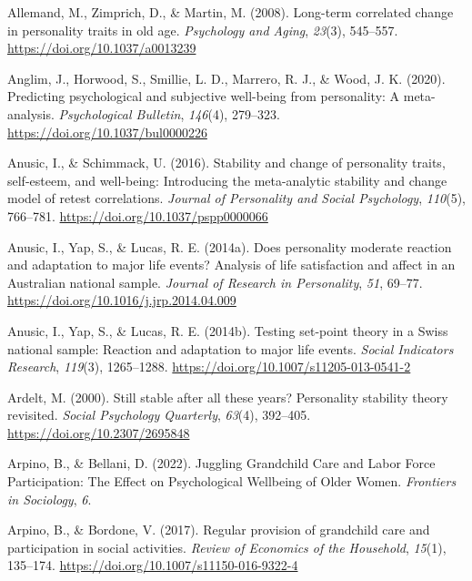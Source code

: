 \documentclass[
  english,
  man,floatsintext]{apa7}
\begin{document}
\leavevmode\hypertarget{ref-allemandLongtermCorrelatedChange2008a}{}%
Allemand, M., Zimprich, D., \& Martin, M. (2008). Long-term correlated change in personality traits in old age. \emph{Psychology and Aging}, \emph{23}(3), 545--557. \url{https://doi.org/10.1037/a0013239}

\leavevmode\hypertarget{ref-anglimPredictingPsychologicalSubjective2020}{}%
Anglim, J., Horwood, S., Smillie, L. D., Marrero, R. J., \& Wood, J. K. (2020). Predicting psychological and subjective well-being from personality: A meta-analysis. \emph{Psychological Bulletin}, \emph{146}(4), 279--323. \url{https://doi.org/10.1037/bul0000226}

\leavevmode\hypertarget{ref-anusicStabilityChangePersonality2016}{}%
Anusic, I., \& Schimmack, U. (2016). Stability and change of personality traits, self-esteem, and well-being: Introducing the meta-analytic stability and change model of retest correlations. \emph{Journal of Personality and Social Psychology}, \emph{110}(5), 766--781. \url{https://doi.org/10.1037/pspp0000066}

\leavevmode\hypertarget{ref-anusicDoesPersonalityModerate2014}{}%
Anusic, I., Yap, S., \& Lucas, R. E. (2014a). Does personality moderate reaction and adaptation to major life events? Analysis of life satisfaction and affect in an Australian national sample. \emph{Journal of Research in Personality}, \emph{51}, 69--77. \url{https://doi.org/10.1016/j.jrp.2014.04.009}

\leavevmode\hypertarget{ref-anusicTestingSetpointTheory2014}{}%
Anusic, I., Yap, S., \& Lucas, R. E. (2014b). Testing set-point theory in a Swiss national sample: Reaction and adaptation to major life events. \emph{Social Indicators Research}, \emph{119}(3), 1265--1288. \url{https://doi.org/10.1007/s11205-013-0541-2}

\leavevmode\hypertarget{ref-ardeltStillStableAll2000}{}%
Ardelt, M. (2000). Still stable after all these years? Personality stability theory revisited. \emph{Social Psychology Quarterly}, \emph{63}(4), 392--405. \url{https://doi.org/10.2307/2695848}

\leavevmode\hypertarget{ref-arpinoJugglingGrandchildCare2022}{}%
Arpino, B., \& Bellani, D. (2022). Juggling Grandchild Care and Labor Force Participation: The Effect on Psychological Wellbeing of Older Women. \emph{Frontiers in Sociology}, \emph{6}.

\leavevmode\hypertarget{ref-arpinoRegularProvisionGrandchild2017}{}%
Arpino, B., \& Bordone, V. (2017). Regular provision of grandchild care and participation in social activities. \emph{Review of Economics of the Household}, \emph{15}(1), 135--174. \url{https://doi.org/10.1007/s11150-016-9322-4}
\end{document}
